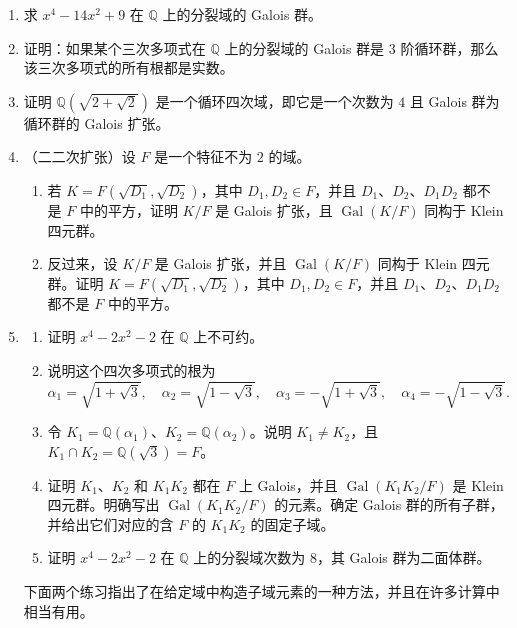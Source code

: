 \begin{enumerate}[label=\arabic*.]
\item 求 $x^4-14x^2+9$ 在 $\mathbb Q$ 上的分裂域的 Galois 群。

\item 证明：如果某个三次多项式在 $\mathbb Q$ 上的分裂域的 Galois 群是 $3$ 阶循环群，那么该三次多项式的所有根都是实数。

\item 证明 $\mathbb Q(\sqrt{2+\sqrt2})$ 是一个循环四次域，即它是一个次数为 $4$ 且 Galois 群为循环群的 Galois 扩张。

\item （二二次扩张）设 $F$ 是一个特征不为 $2$ 的域。
\begin{enumerate}[label=(\alph*)]
\item 若 $K=F(\sqrt{D_1},\sqrt{D_2})$，其中 $D_1,D_2\in F$，并且 $D_1$、$D_2$、$D_1D_2$ 都不是 $F$ 中的平方，证明 $K/F$ 是 Galois 扩张，且 $\operatorname{Gal}(K/F)$ 同构于 Klein 四元群。
\item 反过来，设 $K/F$ 是 Galois 扩张，并且 $\operatorname{Gal}(K/F)$ 同构于 Klein 四元群。证明 $K=F(\sqrt{D_1},\sqrt{D_2})$，其中 $D_1,D_2\in F$，并且 $D_1$、$D_2$、$D_1D_2$ 都不是 $F$ 中的平方。
\end{enumerate}

\item
\begin{enumerate}[label=(\alph*)]
\item 证明 $x^4-2x^2-2$ 在 $\mathbb Q$ 上不可约。
\item 说明这个四次多项式的根为
\[
\alpha_1=\sqrt{1+\sqrt3},\quad
\alpha_2=\sqrt{1-\sqrt3},\quad
\alpha_3=-\sqrt{1+\sqrt3},\quad
\alpha_4=-\sqrt{1-\sqrt3}.
\]
\item 令 $K_1=\mathbb Q(\alpha_1)$、$K_2=\mathbb Q(\alpha_2)$。说明 $K_1\neq K_2$，且 $K_1\cap K_2=\mathbb Q(\sqrt3)=F$。
\item 证明 $K_1$、$K_2$ 和 $K_1K_2$ 都在 $F$ 上 Galois，并且 $\operatorname{Gal}(K_1K_2/F)$ 是 Klein 四元群。明确写出 $\operatorname{Gal}(K_1K_2/F)$ 的元素。确定 Galois 群的所有子群，并给出它们对应的含 $F$ 的 $K_1K_2$ 的固定子域。
\item 证明 $x^4-2x^2-2$ 在 $\mathbb Q$ 上的分裂域次数为 $8$，其 Galois 群为二面体群。
\end{enumerate}

下面两个练习指出了在给定域中构造子域元素的一种方法，并且在许多计算中相当有用。


\end{enumerate}

